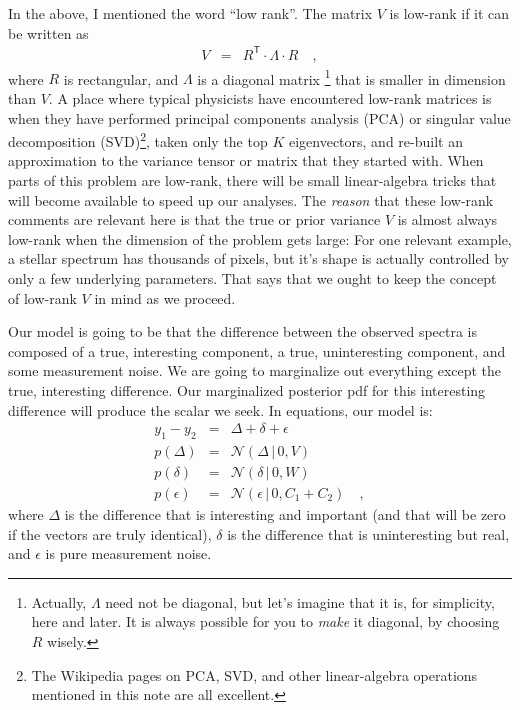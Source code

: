\documentclass[12pt,letterpaper]{article}
\newcommand{\acronym}[1]{{\small{#1}}}
\newcommand{\tra}[1]{{#1}^{\mathsf{T}}}
\newcommand{\given}{\,|\,}
\newcommand{\normal}{\mathcal{N}}
\begin{document}
In the above, I mentioned the word ``low rank''. The matrix $V$ is
low-rank if it can be written as
\begin{eqnarray}
V &=& \tra{R}\cdot\Lambda\cdot R
\label{eq:lowrank}\quad ,
\end{eqnarray}
where $R$ is rectangular, and $\Lambda$ is a diagonal matrix%
\footnote{Actually, $\Lambda$ need not be diagonal, but let's imagine
  that it is, for simplicity, here and later. It is always possible for
  you to \emph{make} it diagonal, by choosing $R$ wisely.}
that is
smaller in dimension than $V$. A place where typical physicists have
encountered low-rank matrices is when they have performed principal
components analysis (\acronym{PCA}) or singular value decomposition
(\acronym{SVD})\footnote{The Wikipedia pages on \acronym{PCA}, \acronym{SVD}, and other
  linear-algebra operations mentioned in this note are all
  excellent.}, taken only the top $K$ eigenvectors, and re-built an
approximation to the variance tensor or matrix that they started with.
When parts of this problem are low-rank, there will be small
linear-algebra tricks that will become available to speed up our
analyses.  The \emph{reason} that these low-rank comments are relevant
here is that the true or prior variance $V$ is almost always low-rank
when the dimension of the problem gets large: For one relevant
example, a stellar spectrum has thousands of pixels, but it's shape is
actually controlled by only a few underlying parameters.  That says
that we ought to keep the concept of low-rank $V$ in mind as we
proceed.

Our model is going to be that the difference between the observed
spectra is composed of a true, interesting component, a true,
uninteresting component, and some measurement noise. We are going to
marginalize out everything except the true, interesting
difference. Our marginalized posterior pdf for this interesting
difference will produce the scalar we seek. In equations, our model is:
\begin{eqnarray}
  y_1 - y_2 &=& \Delta + \delta + \epsilon
\\
  p(\Delta) &=& \normal(\Delta\given 0,V)
\\
  p(\delta) &=& \normal(\delta\given 0,W)
\\
  p(\epsilon) &=& \normal(\epsilon\given 0,C_1+C_2)
\quad ,
\end{eqnarray}
where $\Delta$ is the difference that is interesting and important
(and that will be zero if the vectors are truly identical), $\delta$
is the difference that is uninteresting but real, and $\epsilon$ is
pure measurement noise.
\end{document}
